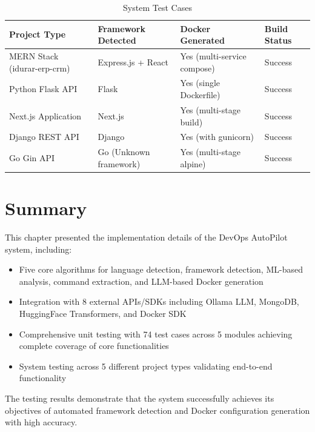 \begin{table}[H]
\centering
\caption{System Test Cases}
\label{tab:system_tests}
\begin{tabular}{|l|l|l|l|}
\hline
\textbf{Project Type} & \textbf{Framework Detected} & \textbf{Docker Generated} & \textbf{Build Status} \\
\hline
MERN Stack (idurar-erp-crm) & Express.js + React & Yes (multi-service compose) & Success \\
Python Flask API & Flask & Yes (single Dockerfile) & Success \\
Next.js Application & Next.js & Yes (multi-stage build) & Success \\
Django REST API & Django & Yes (with gunicorn) & Success \\
Go Gin API & Go (Unknown framework) & Yes (multi-stage alpine) & Success \\
\hline
\end{tabular}
\end{table}

\section{Summary}

This chapter presented the implementation details of the DevOps AutoPilot system, including:

\begin{itemize}
    \item Five core algorithms for language detection, framework detection, ML-based analysis, command extraction, and LLM-based Docker generation
    \item Integration with 8 external APIs/SDKs including Ollama LLM, MongoDB, HuggingFace Transformers, and Docker SDK
    \item Comprehensive unit testing with 74 test cases across 5 modules achieving complete coverage of core functionalities
    \item System testing across 5 different project types validating end-to-end functionality
\end{itemize}

The testing results demonstrate that the system successfully achieves its objectives of automated framework detection and Docker configuration generation with high accuracy.
